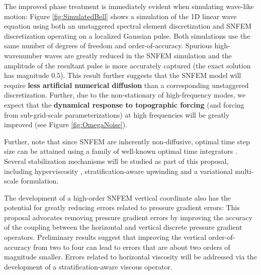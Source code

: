 \documentclass[11pt]{article}
\begin{document}
The improved phase treatment is immediately evident when simulating wave-like motion:  Figure \ref{fig:SimulatedBell} shows a simulation of the 1D linear wave equation using both an unstaggered spectral element discretization and SNFEM discretization operating on a localized Gaussian pulse.  Both simulations use the same number of degrees of freedom and order-of-accuracy.  Spurious high-wavenumber waves are greatly reduced in the SNFEM simulation and the amplitude of the resultant pulse is more accurately captured (the exact solution has magnitude $0.5$).  This result further suggests that the SNFEM model will require \textbf{less artificial numerical diffusion} than a corresponding unstaggered discretization.  Further, due to the non-stationary of high-frequency modes, we expect that the \textbf{dynamical response to topographic forcing} (and forcing from sub-grid-scale parameterizations) at high frequencies will be greatly improved (see Figure \ref{fig:OmegaNoise}). 

Further, note that since SNFEM are inherently non-diffusive, optimal time step size can be attained using a family of well-known optimal time integrators \cite{kinnmark1984one}.  Several stabilization mechanisms will be studied as part of this proposal, including hyperviscosity \cite{guba2014viscosity, ullrich2014global}, stratification-aware upwinding and a variational multi-scale formulation.

The development of a high-order SNFEM vertical coordinate also has the potential for greatly reducing errors related to pressure gradient errors:  This proposal advocates removing pressure gradient errors by improving the accuracy of the coupling between the horizontal and vertical discrete pressure gradient operators.  Preliminary results suggest that improving the vertical order-of-accuracy from two to four can lead to errors that are about two orders of magnitude smaller.  Errors related to horizontal viscosity will be addressed via the development of a stratification-aware viscous operator.



\end{document}
